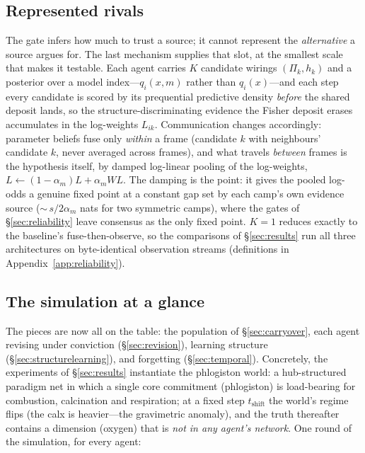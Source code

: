 \documentclass[runningheads]{llncs}
\begin{document}
\subsection{Represented rivals}
\label{sec:rivals}

The gate infers how much to trust a source; it cannot represent the \emph{alternative} a
source argues for. The last mechanism supplies that slot, at the smallest scale that makes it
testable. Each agent carries $K$ candidate wirings $(\Pi_k,h_k)$ and a posterior over a model
index---$q_i(x,m)$ rather than $q_i(x)$---and each step every candidate is scored by its
prequential predictive density \emph{before} the shared deposit lands, so the
structure-discriminating evidence the Fisher deposit erases accumulates in the log-weights
$L_{ik}$. Communication changes accordingly: parameter beliefs fuse only \emph{within} a frame
(candidate $k$ with neighbours' candidate $k$, never averaged across frames), and what travels
\emph{between} frames is the hypothesis itself, by damped log-linear pooling of the
log-weights, $L\leftarrow(1-\alpha_m)L+\alpha_m W L$. The damping is the point: it gives the
pooled log-odds a genuine fixed point at a constant gap set by each camp's own evidence source
(${\sim}\,s/2\alpha_m$ nats for two symmetric camps), where the gates of
\S\ref{sec:reliability} leave consensus as the only fixed point. $K=1$ reduces exactly to the
baseline's fuse-then-observe, so the comparisons of \S\ref{sec:results} run all three
architectures on byte-identical observation streams (definitions in
Appendix~\ref{app:reliability}).

\subsection{The simulation at a glance}
\label{sec:model}

The pieces are now all on the table: the population of \S\ref{sec:carryover}, each agent revising
under conviction (\S\ref{sec:revision}), learning structure (\S\ref{sec:structurelearning}), and
forgetting (\S\ref{sec:temporal}). Concretely, the experiments of \S\ref{sec:results} instantiate the phlogiston world: a hub-structured
paradigm net in which a single core commitment (phlogiston) is load-bearing for combustion,
calcination and respiration; at a fixed step $t_{\mathrm{shift}}$ the world's regime flips (the calx
is heavier---the gravimetric anomaly), and the truth thereafter contains a dimension (oxygen) that is
\emph{not in any agent's network}. One round of the simulation, for every agent:
\end{document}
